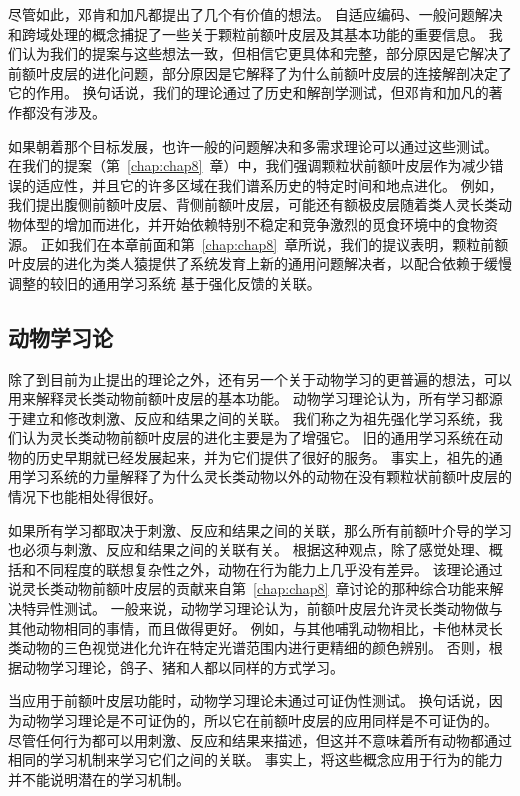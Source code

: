 尽管如此，邓肯和加凡都提出了几个有价值的想法。
自适应编码、一般问题解决和跨域处理的概念捕捉了一些关于颗粒前额叶皮层及其基本功能的重要信息。
我们认为我们的提案与这些想法一致，但相信它更具体和完整，部分原因是它解决了前额叶皮层的进化问题，部分原因是它解释了为什么前额叶皮层的连接解剖决定了它的作用。
换句话说，我们的理论通过了历史和解剖学测试，但邓肯和加凡的著作都没有涉及。
\par


如果朝着那个目标发展，也许一般的问题解决和多需求理论可以通过这些测试。
在我们的提案（第~\ref{chap:chap8}~章）中，我们强调颗粒状前额叶皮层作为减少错误的适应性，并且它的许多区域在我们谱系历史的特定时间和地点进化。
例如，我们提出腹侧前额叶皮层、背侧前额叶皮层，可能还有额极皮层随着类人灵长类动物体型的增加而进化，并开始依赖特别不稳定和竞争激烈的觅食环境中的食物资源。
正如我们在本章前面和第~\ref{chap:chap8}~章所说，我们的提议表明，颗粒前额叶皮层的进化为类人猿提供了系统发育上新的通用问题解决者，以配合依赖于缓慢调整的较旧的通用学习系统 基于强化反馈的关联。



\subsection{动物学习论}
除了到目前为止提出的理论之外，还有另一个关于动物学习的更普遍的想法，可以用来解释灵长类动物前额叶皮层的基本功能。
动物学习理论认为，所有学习都源于建立和修改刺激、反应和结果之间的关联。
我们称之为祖先强化学习系统，我们认为灵长类动物前额叶皮层的进化主要是为了增强它。
旧的通用学习系统在动物的历史早期就已经发展起来，并为它们提供了很好的服务。
事实上，祖先的通用学习系统的力量解释了为什么灵长类动物以外的动物在没有颗粒状前额叶皮层的情况下也能相处得很好。
\par


如果所有学习都取决于刺激、反应和结果之间的关联，那么所有前额叶介导的学习也必须与刺激、反应和结果之间的关联有关。
根据这种观点，除了感觉处理、概括和不同程度的联想复杂性之外，动物在行为能力上几乎没有差异。
该理论通过说灵长类动物前额叶皮层的贡献来自第~\ref{chap:chap8}~章讨论的那种综合功能来解决特异性测试。
一般来说，动物学习理论认为，前额叶皮层允许灵长类动物做与其他动物相同的事情，而且做得更好。
例如，与其他哺乳动物相比，卡他林灵长类动物的三色视觉进化允许在特定光谱范围内进行更精细的颜色辨别。
否则，根据动物学习理论，鸽子、猪和人都以同样的方式学习。
\par


当应用于前额叶皮层功能时，动物学习理论未通过可证伪性测试。
换句话说，因为动物学习理论是不可证伪的，所以它在前额叶皮层的应用同样是不可证伪的。
尽管任何行为都可以用刺激、反应和结果来描述，但这并不意味着所有动物都通过相同的学习机制来学习它们之间的关联。
事实上，将这些概念应用于行为的能力并不能说明潜在的学习机制。
\par


